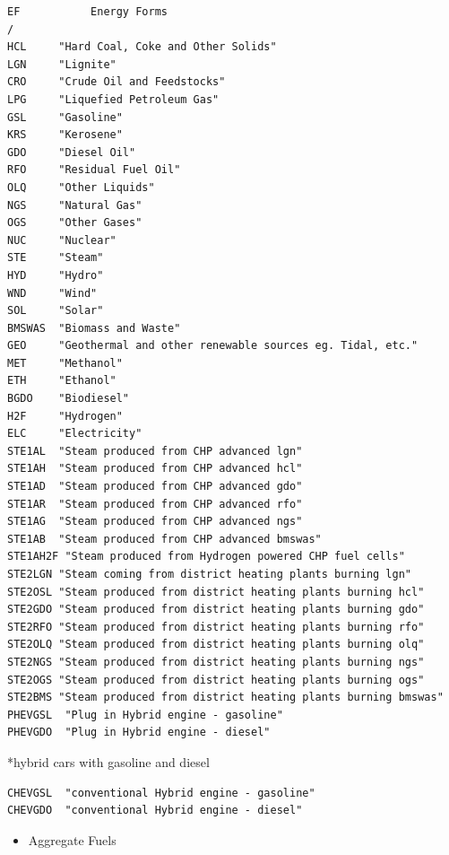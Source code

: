 \documentclass[a4paper,]{scrartcl}
\providecommand{\tightlist}{%
  \setlength{\itemsep}{0pt}\setlength{\parskip}{0pt}}
\begin{document}
\begin{lstlisting}
EF           Energy Forms
/
HCL     "Hard Coal, Coke and Other Solids"
LGN     "Lignite"
CRO     "Crude Oil and Feedstocks"
LPG     "Liquefied Petroleum Gas"
GSL     "Gasoline"
KRS     "Kerosene"
GDO     "Diesel Oil"
RFO     "Residual Fuel Oil"
OLQ     "Other Liquids"
NGS     "Natural Gas"
OGS     "Other Gases"
NUC     "Nuclear"
STE     "Steam"
HYD     "Hydro"
WND     "Wind"
SOL     "Solar"
BMSWAS  "Biomass and Waste"
GEO     "Geothermal and other renewable sources eg. Tidal, etc."
MET     "Methanol"
ETH     "Ethanol"
BGDO    "Biodiesel"
H2F     "Hydrogen"
ELC     "Electricity"
STE1AL  "Steam produced from CHP advanced lgn"
STE1AH  "Steam produced from CHP advanced hcl"
STE1AD  "Steam produced from CHP advanced gdo"
STE1AR  "Steam produced from CHP advanced rfo"
STE1AG  "Steam produced from CHP advanced ngs"
STE1AB  "Steam produced from CHP advanced bmswas"
STE1AH2F "Steam produced from Hydrogen powered CHP fuel cells"
STE2LGN "Steam coming from district heating plants burning lgn"
STE2OSL "Steam produced from district heating plants burning hcl"
STE2GDO "Steam produced from district heating plants burning gdo"
STE2RFO "Steam produced from district heating plants burning rfo"
STE2OLQ "Steam produced from district heating plants burning olq"
STE2NGS "Steam produced from district heating plants burning ngs"
STE2OGS "Steam produced from district heating plants burning ogs"
STE2BMS "Steam produced from district heating plants burning bmswas"
PHEVGSL  "Plug in Hybrid engine - gasoline"
PHEVGDO  "Plug in Hybrid engine - diesel"
\end{lstlisting}

*hybrid cars with gasoline and diesel

\begin{lstlisting}
CHEVGSL  "conventional Hybrid engine - gasoline"
CHEVGDO  "conventional Hybrid engine - diesel"
\end{lstlisting}

\begin{itemize}
\tightlist
\item
  Aggregate Fuels
\end{itemize}
\end{document}
